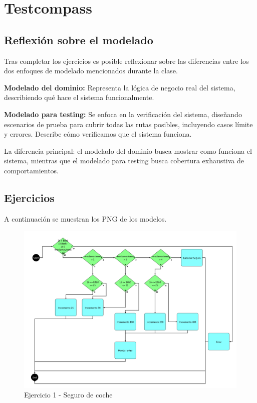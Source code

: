\chapter{Testcompass}


\section{Reflexión sobre el modelado}
Tras completar los ejercicios es posible reflexionar sobre las diferencias entre los dos enfoques de modelado mencionados durante la clase.

\textbf{Modelado del dominio:} Representa la lógica de negocio real del sistema, describiendo qué hace el sistema funcionalmente.

\textbf{Modelado para testing:} Se enfoca en la verificación del sistema, diseñando escenarios de prueba para cubrir todas las rutas posibles, incluyendo casos límite y errores. Describe cómo verificamos que el sistema funciona.

La diferencia principal: el modelado del dominio busca mostrar como funciona el sistema, mientras que el modelado para testing busca cobertura exhaustiva de comportamientos.

\section{Ejercicios}
A continuación se muestran los PNG de los modelos.

\begin{figure}[htbp]
    \centering
    \includegraphics[width=0.95\columnwidth]{images/SeguroCoche.png}
    \caption{Ejercicio 1 - Seguro de coche}
    \label{fig:SeguroCoche}
\end{figure}

